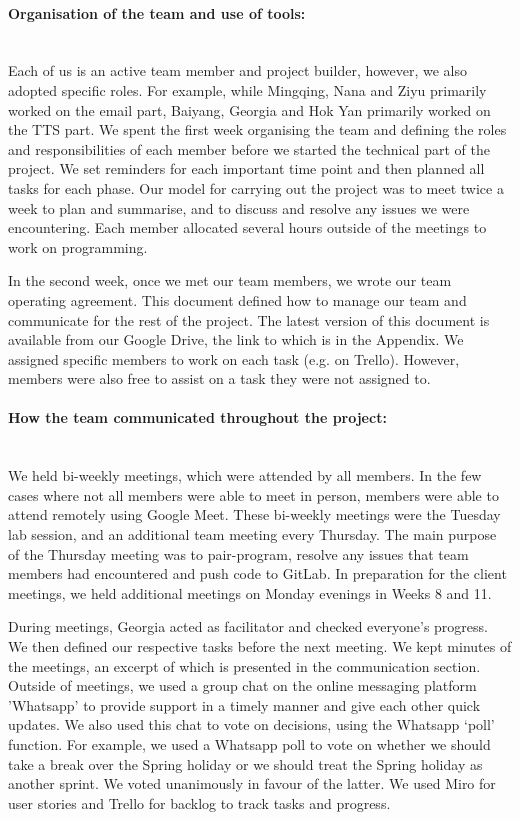 \documentclass{article}
\begin{document}
\paragraph{Organisation of the team and use of tools:}\hspace{0pt}\\
Each of us is an active team member and project builder, however, we also adopted specific roles. For example, while Mingqing, Nana and Ziyu primarily worked on the email part, Baiyang, Georgia and Hok Yan primarily worked on the TTS part. We spent the first week organising the team and defining the roles and responsibilities of each member before we started the technical part of the project. We set reminders for each important time point and then planned all tasks for each phase. Our model for carrying out the project was to meet twice a week to plan and summarise, and to discuss and resolve any issues we were encountering. Each member allocated several hours outside of the meetings to work on programming. 

In the second week, once we met our team members, we wrote our team operating agreement. This document defined how to manage our team and communicate for the rest of the project. The latest version of this document is available from our Google Drive, the link to which is in the Appendix. We assigned specific members to work on each task (e.g. on Trello). However, members were also free to assist on a task they were not assigned to. 

\paragraph{How the team communicated throughout the project:}\hspace{0pt}\\
We held bi-weekly meetings, which were attended by all members. In the few cases where not all members were able to meet in person, members were able to attend remotely using Google Meet. These bi-weekly meetings were the Tuesday lab session, and an additional team meeting every Thursday. The main purpose of the Thursday meeting was to pair-program, resolve any issues that team members had encountered and push code to GitLab. In preparation for the client meetings, we held additional meetings on Monday evenings in Weeks 8 and 11. 

During meetings, Georgia acted as facilitator and checked everyone's progress. We then defined our respective tasks before the next meeting. We kept minutes of the meetings, an excerpt of which is presented in the communication section. Outside of meetings, we used a group chat on the online messaging platform 'Whatsapp' to provide support in a timely manner and give each other quick updates. We also used this chat to vote on decisions, using the Whatsapp ‘poll’ function. For example, we used a Whatsapp poll to vote on whether we should take a break over the Spring holiday or we should treat the Spring holiday as another sprint. We voted unanimously in favour of the latter. We used Miro for user stories and Trello for backlog to track tasks and progress.
\end{document}
